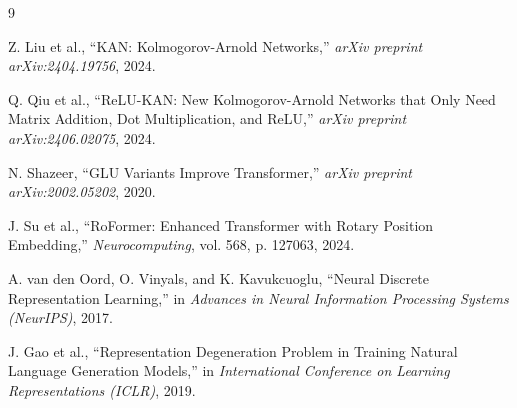 \documentclass[11pt,a4paper]{article}
\begin{document}
\begin{thebibliography}{9}

Z. Liu et al., ``KAN: Kolmogorov-Arnold Networks,'' \emph{arXiv preprint arXiv:2404.19756}, 2024.

Q. Qiu et al., ``ReLU-KAN: New Kolmogorov-Arnold Networks that Only Need Matrix Addition, Dot Multiplication, and ReLU,'' \emph{arXiv preprint arXiv:2406.02075}, 2024.

N. Shazeer, ``GLU Variants Improve Transformer,'' \emph{arXiv preprint arXiv:2002.05202}, 2020.

J. Su et al., ``RoFormer: Enhanced Transformer with Rotary Position Embedding,'' \emph{Neurocomputing}, vol. 568, p. 127063, 2024.

A. van den Oord, O. Vinyals, and K. Kavukcuoglu, ``Neural Discrete Representation Learning,'' in \emph{Advances in Neural Information Processing Systems (NeurIPS)}, 2017.

J. Gao et al., ``Representation Degeneration Problem in Training Natural Language Generation Models,'' in \emph{International Conference on Learning Representations (ICLR)}, 2019.

\end{thebibliography}
\end{document}
